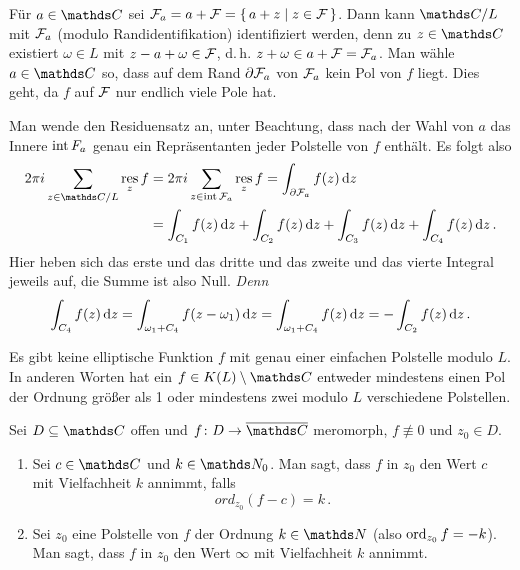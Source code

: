 \begin{bewe}
Für $a\in\CC$ sei $\mathcal{F}_a = a + \mathcal{F} = \left\{\,a + z \mid z\in\mathcal{F}\,\right\}$.
Dann kann $\CC/L$ mit $\mathcal{F}_a$ (modulo Randidentifikation) identifiziert werden, denn zu $z\in\CC$ existiert $\omega \in L$ mit $z-a+\omega \in \mathcal{F}$, d.\,h. $z+\omega \in a + \mathcal{F} = \mathcal{F}_a$.
Man wähle $a\in\CC$ so, dass auf dem Rand $\partial \mathcal{F}_a$ von $\mathcal{F}_a$ kein Pol von $f$ liegt.
Dies geht, da $f$ auf $\mathcal{F}$ nur endlich viele Pole hat.

Man wende den Residuensatz an, unter Beachtung, dass nach der Wahl von $a$ das Innere $\operatorname{int} F_a$ genau ein Repräsentanten jeder Polstelle von $f$ enthält.
Es folgt also
\begin{align*}
	2\pi i \sum_{z\in\CC/L} \res_z f
	&= 2\pi i \sum_{z\in \innere \F_a} \res_z f
	= \int_{\partial \F_a} f(z)\opd z \\
	&= \int_{C_1} f(z) \opd z + \int_{C_2} f(z) \opd z + \int_{C_3} f(z) \opd z + \int_{C_4} f(z) \opd z
	\,.
\end{align*}
Hier heben sich das erste und das dritte und das zweite und das vierte Integral jeweils auf, die Summe ist also Null.
\emph{Denn}
\[
	\int_{C_4} f(z)\,\mathrm{d} z
	= \int_{\omega_1 + C_4} f(z-\omega_1) \,\mathrm{d} z
	= \int_{\omega_1 + C_4} f(z)\,\mathrm{d} z
	= -\int_{C_2} f(z) \,\mathrm{d} z
	\,.
\]
\end{bewe}

\begin{koro}
Es gibt keine elliptische Funktion $f$ mit genau einer einfachen Polstelle modulo $L$.
In anderen Worten hat ein $f\in K(L)\setminus\CC$ entweder mindestens einen Pol der Ordnung größer als 1 oder mindestens zwei modulo $L$ verschiedene Polstellen.
\end{koro}

\begin{defi-noind}
Sei $D \subseteq \CC$ offen und $f\colon D \ra \closure \CC$ meromorph, $f \not\equiv 0$ und $z_0 \in D$.
\begin{enumerate}
\item Sei $c\in \CC$ und $k\in\NN_0$.
Man sagt, dass $f$ in $z_0$ den Wert $c$ mit Vielfachheit $k$ annimmt, falls
\[
	ord_{z_0} (f-c) = k
	\,.
\]

\item Sei $z_0$ eine Polstelle von $f$ der Ordnung $k\in\NN$ (also $\operatorname*{ord}_{z_0} f = -k$).
Man sagt, dass $f$ in $z_0$ den Wert $\infty$ mit Vielfachheit $k$ annimmt.
\end{enumerate}
\end{defi-noind}

